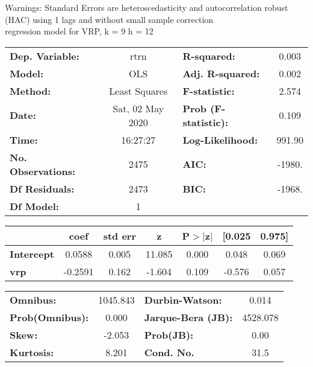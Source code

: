 Warnings: \newline
 [1] Standard Errors are heteroscedasticity and autocorrelation robust (HAC) using 1 lags and without small sample correction\\ 

regression model for VRP, k = 9 h = 12\begin{center}
\begin{tabular}{lclc}
\toprule
\textbf{Dep. Variable:}    &       rtrn       & \textbf{  R-squared:         } &     0.003   \\
\textbf{Model:}            &       OLS        & \textbf{  Adj. R-squared:    } &     0.002   \\
\textbf{Method:}           &  Least Squares   & \textbf{  F-statistic:       } &     2.574   \\
\textbf{Date:}             & Sat, 02 May 2020 & \textbf{  Prob (F-statistic):} &    0.109    \\
\textbf{Time:}             &     16:27:27     & \textbf{  Log-Likelihood:    } &    991.90   \\
\textbf{No. Observations:} &        2475      & \textbf{  AIC:               } &    -1980.   \\
\textbf{Df Residuals:}     &        2473      & \textbf{  BIC:               } &    -1968.   \\
\textbf{Df Model:}         &           1      & \textbf{                     } &             \\
\bottomrule
\end{tabular}
\begin{tabular}{lcccccc}
                   & \textbf{coef} & \textbf{std err} & \textbf{z} & \textbf{P$> |$z$|$} & \textbf{[0.025} & \textbf{0.975]}  \\
\midrule
\textbf{Intercept} &       0.0588  &        0.005     &    11.085  &         0.000        &        0.048    &        0.069     \\
\textbf{vrp}       &      -0.2591  &        0.162     &    -1.604  &         0.109        &       -0.576    &        0.057     \\
\bottomrule
\end{tabular}
\begin{tabular}{lclc}
\textbf{Omnibus:}       & 1045.843 & \textbf{  Durbin-Watson:     } &    0.014  \\
\textbf{Prob(Omnibus):} &   0.000  & \textbf{  Jarque-Bera (JB):  } & 4528.078  \\
\textbf{Skew:}          &  -2.053  & \textbf{  Prob(JB):          } &     0.00  \\
\textbf{Kurtosis:}      &   8.201  & \textbf{  Cond. No.          } &     31.5  \\
\bottomrule
\end{tabular}
\end{center}

